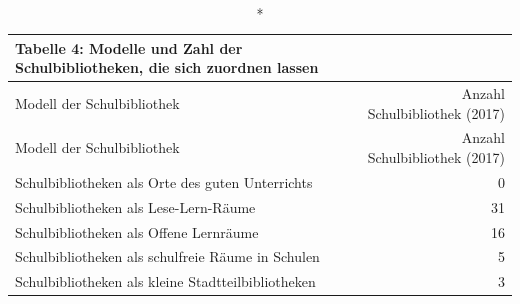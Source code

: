 \documentclass[a4paper,
fontsize=11pt,
oneside,
numbers=noperiodatend,
parskip=half-,
bibliography=totoc,
final
]{scrartcl}
\begin{document}
\begin{longtable}[]{@{}lr@{}}
\caption*{Tabelle 4: Modelle und Zahl der Schulbibliotheken, die sich zuordnen
lassen}\tabularnewline
\toprule
\begin{minipage}[b]{0.41\columnwidth}\raggedright\strut
Modell der Schulbibliothek\strut
\end{minipage} & \begin{minipage}[b]{0.41\columnwidth}\raggedleft\strut
Anzahl Schulbibliothek (2017)\strut
\end{minipage}\tabularnewline
\midrule
\endfirsthead
\toprule
\begin{minipage}[b]{0.41\columnwidth}\raggedright\strut
Modell der Schulbibliothek\strut
\end{minipage} & \begin{minipage}[b]{0.41\columnwidth}\raggedleft\strut
Anzahl Schulbibliothek (2017)\strut
\end{minipage}\tabularnewline
\midrule
\endhead
\begin{minipage}[t]{0.41\columnwidth}\raggedright\strut
Schulbibliotheken als Orte des guten Unterrichts\strut
\end{minipage} & \begin{minipage}[t]{0.41\columnwidth}\raggedleft\strut
0\strut
\end{minipage}\tabularnewline
\begin{minipage}[t]{0.41\columnwidth}\raggedright\strut
Schulbibliotheken als Lese-Lern-Räume\strut
\end{minipage} & \begin{minipage}[t]{0.41\columnwidth}\raggedleft\strut
31\strut
\end{minipage}\tabularnewline
\begin{minipage}[t]{0.41\columnwidth}\raggedright\strut
Schulbibliotheken als Offene Lernräume\strut
\end{minipage} & \begin{minipage}[t]{0.41\columnwidth}\raggedleft\strut
16\strut
\end{minipage}\tabularnewline
\begin{minipage}[t]{0.41\columnwidth}\raggedright\strut
Schulbibliotheken als schulfreie Räume in Schulen\strut
\end{minipage} & \begin{minipage}[t]{0.41\columnwidth}\raggedleft\strut
5\strut
\end{minipage}\tabularnewline
\begin{minipage}[t]{0.41\columnwidth}\raggedright\strut
Schulbibliotheken als kleine Stadtteilbibliotheken\strut
\end{minipage} & \begin{minipage}[t]{0.41\columnwidth}\raggedleft\strut
3\strut
\end{minipage}\tabularnewline
\bottomrule
\end{longtable}
\end{document}
